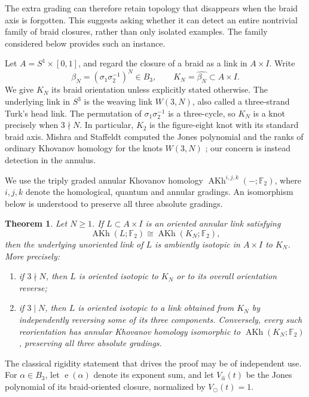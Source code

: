 \documentclass[11pt]{amsart}
\newtheorem{theorem}{Theorem}[section]
\theoremstyle{remark}
\newcommand{\F}{\mathbb F_2}
\newcommand{\AKh}{\operatorname{AKh}}
\newcommand{\e}{\operatorname{e}}
\begin{document}
The extra grading can therefore retain topology that disappears when the braid axis is forgotten. This suggests asking whether it can detect an entire nontrivial family of braid closures, rather than only isolated examples. The family considered below provides such an instance.

Let \(A=S^1\times[0,1]\), and regard the closure of a braid as a link in
\(A\times I\).  Write
\[
  \beta_N=(\sigma_1\sigma_2^{-1})^N\in B_3,
  \qquad K_N=\widehat{\beta_N}\subset A\times I .
\]
We give \(K_N\) its braid orientation unless explicitly stated otherwise.
The underlying link in \(S^3\) is the weaving link \(W(3,N)\), also called a
three-strand Turk's head link.  The permutation of \(\sigma_1\sigma_2^{-1}\) is a
three-cycle, so \(K_N\) is a knot precisely when \(3\nmid N\).  In particular,
\(K_2\) is the figure-eight knot with its standard braid axis.  Mishra and Staffeldt
computed the Jones polynomial and the ranks of ordinary Khovanov homology for the
knots \(W(3,N)\) \cite{MishraStaffeldt}; our concern is instead detection in the
annulus.

We use the triply graded annular Khovanov homology
\(\AKh^{i,j,k}(-;\F)\), where \(i,j,k\) denote the homological, quantum and annular
gradings.  An isomorphism below is understood to preserve all three absolute gradings.

\begin{theorem}\label{thm:main}
Let \(N\geq 1\).  If \(L\subset A\times I\) is an oriented annular link satisfying
\[
  \AKh(L;\F)\cong \AKh(K_N;\F),
\]
then the underlying unoriented link of \(L\) is ambiently isotopic in \(A\times I\)
to \(K_N\).  More precisely:
\begin{enumerate}[label=\textup{(\roman*)}]
\item if \(3\nmid N\), then \(L\) is oriented isotopic to \(K_N\) or to its overall
orientation reverse;
\item if \(3\mid N\), then \(L\) is oriented isotopic to a link obtained from \(K_N\)
by independently reversing some of its three components.  Conversely, every such
reorientation has annular Khovanov homology isomorphic to \(\AKh(K_N;\F)\), preserving
all three absolute gradings.
\end{enumerate}
\end{theorem}

The classical rigidity statement that drives the proof may be of independent use.
For \(\alpha\in B_3\), let \(\e(\alpha)\) denote its exponent sum, and let
\(V_{\widehat\alpha}(t)\) be the Jones polynomial of its braid-oriented closure,
normalized by \(V_{\bigcirc}(t)=1\).
\end{document}
